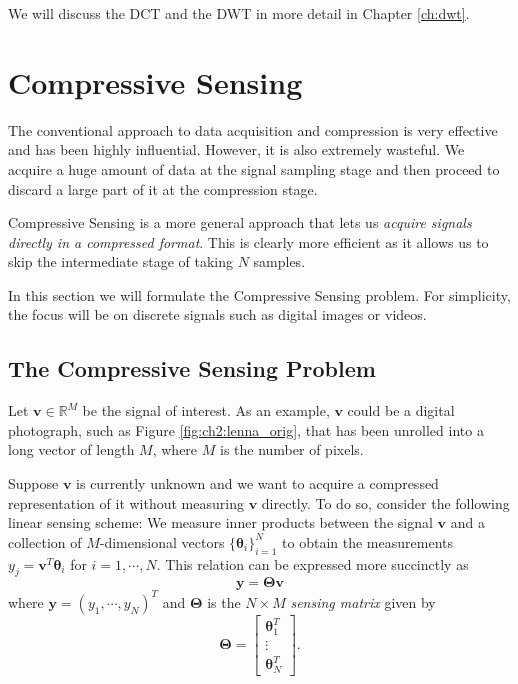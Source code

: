 We will discuss the DCT and the DWT in more detail in Chapter \ref{ch:dwt}.

\section{Compressive Sensing}
The conventional approach to data acquisition and compression is very effective and has been highly influential.
However, it is also extremely wasteful.
We acquire a huge amount of data at the signal sampling stage and then proceed to discard a large part of it at the compression stage.

Compressive Sensing is a more general approach that lets us \emph{acquire signals directly in a compressed format}.
This is clearly more efficient as it allows us to skip the intermediate stage of taking $N$ samples.

In this section we will formulate the Compressive Sensing problem.
For simplicity, the focus will be on discrete signals such as digital images or videos.

\subsection{The Compressive Sensing Problem}
Let $\bm v \in\mathbb{R}^M$ be the signal of interest.
As an example, $\bm v$ could be a digital photograph, such as Figure \ref{fig:ch2:lenna_orig}, that has been unrolled into a long vector of length $M$, where $M$ is the number of pixels.

Suppose $\bm v$ is currently unknown and we want to acquire a compressed representation of it without measuring $\bm v$ directly.
To do so, consider the following linear sensing scheme:
We measure inner products between the signal $\bm v$ and a collection of $M$-dimensional vectors $\{\bm\theta_i\}_{i=1}^N$ to obtain the measurements $y_j = \bm v^T\bm\theta_i$ for $i = 1,\cdots,N$. 
This relation can be expressed more succinctly as%
\begin{equation}
\label{eqn:cs_sensing}
  \bm y = \bm\Theta\bm v
\end{equation}
where $\bm y = (y_1,\cdots,y_N)^T$ and $\bm\Theta$ is the $N\times M$ \emph{sensing matrix} given by
\begin{equation}
\label{eqn:ch2:sensor2}
  \bm\Theta = 
  \begin{bmatrix} 
    \bm \theta_1^T\\
    \vdots\\
    \bm \theta_N^T
  \end{bmatrix}.
\end{equation}

